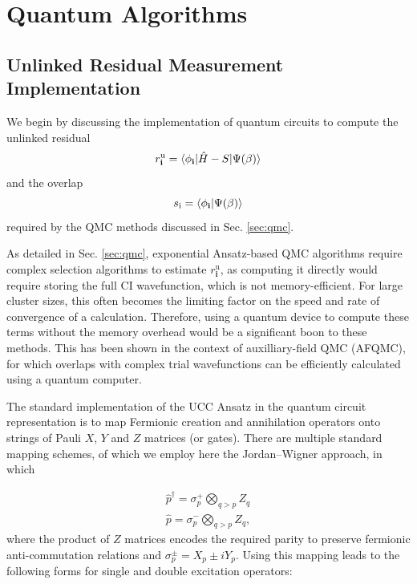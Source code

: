 \documentclass[%
 reprint,
 amsmath,amssymb,
 aps,
]{revtex4-2}
\begin{document}
\section{Quantum Algorithms}
\subsection{Unlinked Residual Measurement Implementation}\label{sec:algorithm}
We begin by discussing the implementation of quantum circuits to compute the unlinked residual 
\begin{equation}
    r^\mathrm{u}_\mathbf{i} = \braket{\phi_\mathbf{i}|\hat H-S|\Psi(\beta)}
\end{equation}
and the overlap
\begin{equation}
    s_\mathrm{i} = \braket{\phi_\mathbf{i}|\Psi(\beta)}
\end{equation}
required by the QMC methods discussed in Sec. \ref{sec:qmc}.


As detailed in Sec. \ref{sec:qmc}, exponential Ansatz-based QMC algorithms require complex selection algorithms to estimate $r_\mathbf{i}^\mathrm{u}$, as computing it directly would require storing the full CI wavefunction, which is not memory-efficient. For large cluster sizes, this often becomes the limiting factor on the speed and rate of convergence of a calculation. Therefore, using a quantum device to compute these terms without the memory overhead would be a significant boon to these methods. This has been shown in the context of auxilliary-field QMC (AFQMC)\cite{Zhang2003}, for which overlaps with complex trial wavefunctions can be efficiently calculated using a quantum computer.\cite{Huggins2022} 

The standard implementation of the UCC Ansatz in the quantum circuit representation is to map Fermionic creation and annihilation operators onto strings of Pauli $X$, $Y$ and $Z$ matrices (or gates). There are multiple standard mapping schemes,\cite{Jordan1928,Bravyi2002,Seeley2012,Tranter2015} of which we employ here the Jordan--Wigner approach,\cite{Jordan1928} in which

\begin{equation}
\begin{split}
\hat p^\dagger = \sigma_p^+ \bigotimes_{q>p} Z_q \\
\hat p = \sigma_p^- \bigotimes_{q>p} Z_q,
\end{split}
\end{equation}
where the product of $Z$ matrices encodes the required parity to preserve fermionic anti-commutation relations and $\sigma_p^\pm = X_p \pm iY_p$. Using this mapping leads to the following forms for single and double excitation operators:
\end{document}

